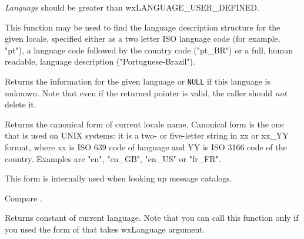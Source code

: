 {\it Language} should be greater than wxLANGUAGE\_USER\_DEFINED.




This function may be used to find the language description structure for the
given locale, specified either as a two letter ISO language code (for example,
"pt"), a language code followed by the country code ("pt\_BR") or a full, human
readable, language description ("Portuguese-Brazil").

Returns the information for the given language or {\tt NULL} if this language
is unknown. Note that even if the returned pointer is valid, the caller should
{\it not} delete it.



\label{wxlocalegetcanonicalname}


Returns the canonical form of current locale name. Canonical form is the
one that is used on UNIX systems: it is a two- or five-letter string in xx or
xx\_YY format, where xx is ISO 639 code of language and YY is ISO 3166 code of
the country. Examples are "en", "en\_GB", "en\_US" or "fr\_FR".

This form is internally used when looking up message catalogs.

Compare .



\label{wxlocalegetlanguage}


Returns  constant of current language.
Note that you can call this function only if you used the form of
 that takes wxLanguage argument.

\label{wxlocalegetlanguageinfo}


